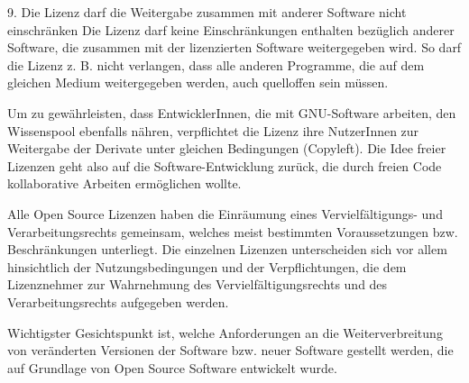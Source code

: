 9. Die Lizenz darf die Weitergabe zusammen mit anderer Software nicht einschränken
Die Lizenz darf keine Einschränkungen enthalten bezüglich anderer Software, die zusammen mit der lizenzierten Software weitergegeben wird. So darf die Lizenz z. B. nicht verlangen, dass alle anderen Programme, die auf dem gleichen Medium weitergegeben werden, auch quelloffen sein müssen.


Um zu gewährleisten, dass EntwicklerInnen, die mit GNU-Software arbeiten, den Wissenspool ebenfalls nähren, verpflichtet die Lizenz ihre NutzerInnen zur Weitergabe der Derivate unter gleichen Bedingungen (Copyleft). Die Idee freier Lizenzen geht also auf die Software-Entwicklung zurück, die durch freien Code kollaborative Arbeiten ermöglichen wollte. 


Alle Open Source Lizenzen haben die Einräumung eines Vervielfältigungs- und Verarbeitungsrechts gemeinsam, welches meist bestimmten Voraussetzungen bzw. Beschränkungen unterliegt. Die einzelnen Lizenzen unterscheiden sich vor allem hinsichtlich der Nutzungsbedingungen und der Verpflichtungen, die dem Lizenznehmer zur Wahrnehmung des Vervielfältigungsrechts und des Verarbeitungsrechts aufgegeben werden.

Wichtigster Gesichtspunkt ist, welche Anforderungen an die Weiterverbreitung von veränderten Versionen der Software bzw. neuer Software gestellt werden, die auf Grundlage von Open Source Software entwickelt wurde.



